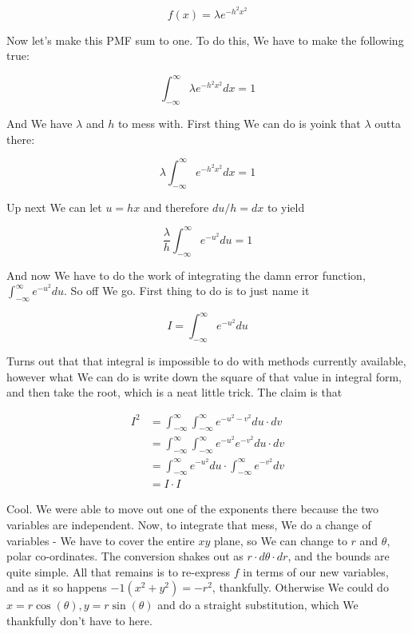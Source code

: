 \documentclass{article}
\begin{document}
		\[ f(x) = \lambda e^{-h^2x^2} \]
		
		Now let's make this PMF sum to one. To do this, We have to make the following true:
		
		\[ \int_{-\infty}^{\infty}\lambda e^{-h^2x^2} dx = 1\]
		
		And We have $\lambda$ and $h$ to mess with. First thing We can do is yoink that $\lambda$ outta there:
		
		\[ \lambda\int_{-\infty}^{\infty}e^{-h^2x^2} dx = 1\]
		
		Up next We can let $u = hx$ and therefore $du/h =  dx$ to yield
		
		\[ \frac{\lambda}{h}\int_{-\infty}^{\infty}e^{-u^2} du = 1\]
		
		And now We have to do the work of integrating the damn error function, $\int_{-\infty}^{\infty}e^{-u^2} du$. So off We go. First thing to do is to just name it
		
		\[ I = \int_{-\infty}^{\infty}e^{-u^2} du \] 
		
		Turns out that that integral is impossible to do with methods currently available, however what We can do is write down the square of that value in integral form, and then take the root, which is a neat little trick. The claim is that
		
		\begin{equation*}
			\begin{split}		
				 I^2 &= \int_{-\infty}^{\infty}\int_{-\infty}^{\infty} e^{-u^2-v^2} du\cdot dv \\
				 		&= \int_{-\infty}^{\infty}\int_{-\infty}^{\infty} e^{-u^2}e^{-v^2} du\cdot dv \\
						&= \int_{-\infty}^{\infty}e^{-u^2}du\cdot \int_{-\infty}^{\infty} e^{-v^2} dv \\
						&= I\cdot I	
			\end{split}
		\end{equation*}
		
		Cool. We were able to move out one of the exponents there because the two variables are independent. Now, to integrate that mess, We do a change of variables - We have to cover the entire $xy$ plane, so We can change to $r$ and $\theta$, polar co-ordinates. The conversion shakes out as $r\cdot d\theta\cdot dr$, and the bounds are quite simple. All that remains is to re-express $f$ in terms of our new variables, and as it so happens $-1(x^2+y^2) = -r^2$, thankfully. Otherwise We could do $x = r\cos(\theta), y=r\sin(\theta)$ and do a straight substitution, which We thankfully don't have to here.
		
\end{document}
